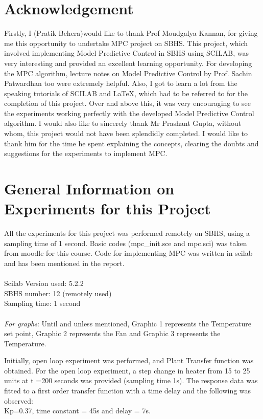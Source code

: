 \section{Acknowledgement }
Firstly, I (Pratik Behera)would like to thank Prof Moudgalya Kannan, for giving me this opportunity to undertake MPC project on SBHS. This project, which involved implementing Model Predictive Control in SBHS using SCILAB, was very interesting and provided an excellent learning opportunity. For developing the MPC algorithm, lecture notes on Model Predictive Control by Prof. Sachin Patwardhan too were extremely helpful. Also, I got to learn a lot from the speaking tutorials of SCILAB and LaTeX, which had to be referred to for the completion of this project. Over and above this, it was very encouraging to see the experiments working perfectly with the developed Model Predictive Control algorithm.
I would also like to sincerely thank Mr Prashant Gupta, without whom, this project would not have been splendidly completed. I would like to thank him for the time he spent explaining the concepts, clearing the doubts and suggestions for the experiments to implement MPC.

\section{General Information on Experiments for this Project}
All the experiments for this project was performed remotely on SBHS, using a sampling time of 1 second. Basic codes (mpc\_init.sce and mpc.sci) was taken from moodle for this course. Code for implementing MPC was written in scilab and has been mentioned in the report. \\ \\
Scilab Version used: 5.2.2 \\
SBHS number: 12 (remotely used) \\
Sampling time: 1 second \\ \\
\emph{For graphs}: Until and unless mentioned, Graphic 1 represents the Temperature set point, Graphic 2 represents the Fan and Graphic 3 represents the Temperature.


Initially, open loop experiment was performed, and Plant Transfer function was obtained. For the open loop experiment, a step change in heater from 15 to 25 units at t =200 seconds was provided (sampling time 1s). The response data was fitted to a first order transfer function with a time delay and the following was observed: \\
Kp=0.37, time constant = 45s and delay = 7s. \\ \\

